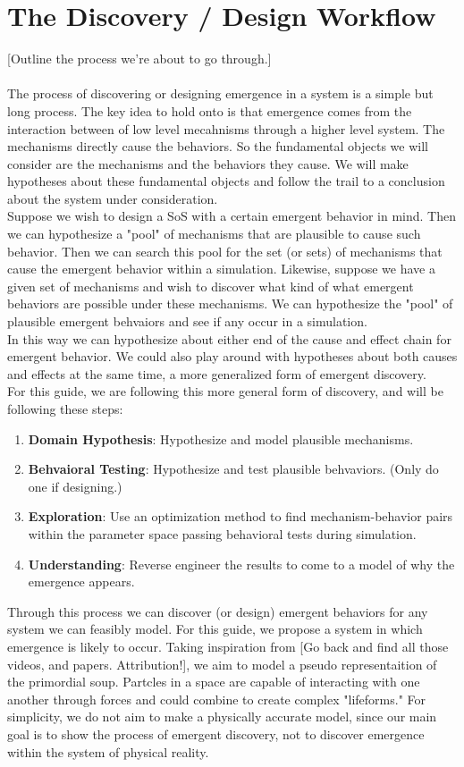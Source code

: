 \documentclass{article}
\begin{document}
\section{The Discovery / Design Workflow}
[Outline the process we're about to go through.]\\
\\
The process of discovering or designing emergence in a system is a simple but long process. 
The key idea to hold onto is that emergence comes from the interaction between of low level mecahnisms through a higher level system. The mechanisms directly cause the behaviors. So the fundamental objects we will consider are the mechanisms and the behaviors they cause. We will make hypotheses about these fundamental objects and follow the trail to a conclusion about the system under consideration. \\
Suppose we wish to design a SoS with a certain emergent behavior in mind. Then we can hypothesize a "pool" of mechanisms that are plausible to cause such behavior. Then we can search this pool for the set (or sets) of mechanisms that cause the emergent behavior within a simulation.
Likewise, suppose we have a given set of mechanisms and wish to discover what kind of what emergent behaviors are possible under these mechanisms. We can hypothesize the "pool" of plausible emergent behvaiors and see if any occur in a simulation.
\\
In this way we can hypothesize about either end of the cause and effect chain for emergent behavior. We could also play around with hypotheses about both causes and effects at the same time, a more generalized form of emergent discovery.\\
For this guide, we are following this more general form of discovery, and
will be following these steps:\\
\begin{enumerate}
\item \textbf{Domain Hypothesis}: Hypothesize and model plausible mechanisms.
\item \textbf{Behvaioral Testing}: Hypothesize and test plausible behvaviors. (Only do one if designing.)
\item \textbf{Exploration}: Use an optimization method to find mechanism-behavior pairs within the parameter space passing behavioral tests during simulation.
\item \textbf{Understanding}: Reverse engineer the results to come to a model of why the emergence appears.
\end{enumerate}
Through this process we can discover (or design) emergent behaviors for any system we can feasibly model. For this guide, we propose a system in which emergence is likely to occur. Taking inspiration from [Go back and find all those videos, and papers. Attribution!], we aim to model a pseudo representaition of the primordial soup. Partcles in a space are capable of interacting with one another through forces and could combine to create complex "lifeforms." For simplicity, we do not aim to make a physically accurate model, since our main goal is to show the process of emergent discovery, not to discover emergence within the system of physical reality.
\end{document}
